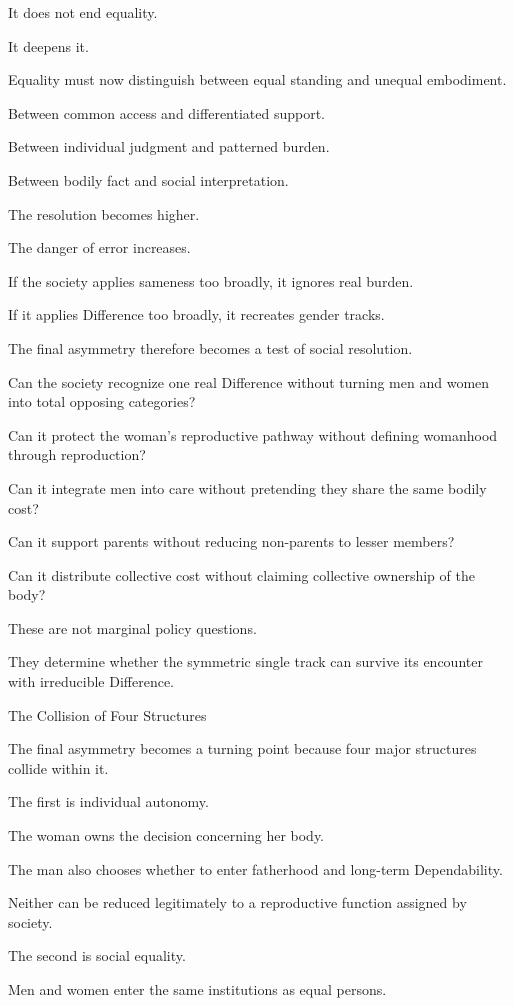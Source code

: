 It does not end equality.

It deepens it.

Equality must now distinguish between equal standing and unequal embodiment.

Between common access and differentiated support.

Between individual judgment and patterned burden.

Between bodily fact and social interpretation.

The resolution becomes higher.

The danger of error increases.

If the society applies sameness too broadly, it ignores real burden.

If it applies Difference too broadly, it recreates gender tracks.

The final asymmetry therefore becomes a test of social resolution.

Can the society recognize one real Difference without turning men and women into total opposing categories?

Can it protect the woman’s reproductive pathway without defining womanhood through reproduction?

Can it integrate men into care without pretending they share the same bodily cost?

Can it support parents without reducing non-parents to lesser members?

Can it distribute collective cost without claiming collective ownership of the body?

These are not marginal policy questions.

They determine whether the symmetric single track can survive its encounter with irreducible Difference.

The Collision of Four Structures

The final asymmetry becomes a turning point because four major structures collide within it.

The first is individual autonomy.

The woman owns the decision concerning her body.

The man also chooses whether to enter fatherhood and long-term Dependability.

Neither can be reduced legitimately to a reproductive function assigned by society.

The second is social equality.

Men and women enter the same institutions as equal persons.

